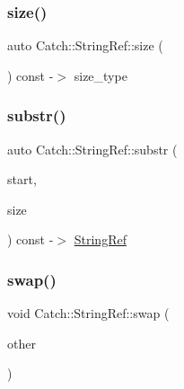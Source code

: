 \mbox{\label{classCatch_1_1StringRef_ae084d72cb2952cee61a63ef36611d0ad}} 
\subsubsection{\texorpdfstring{size()}{size()}}
{\footnotesize\ttfamily auto Catch\+::\+String\+Ref\+::size (\begin{DoxyParamCaption}{ }\end{DoxyParamCaption}) const -\/$>$  size\+\_\+type\hspace{0.3cm}{\ttfamily [noexcept]}}

\mbox{\label{classCatch_1_1StringRef_a248568b467cf6599320903ae613c8eee}} 
\subsubsection{\texorpdfstring{substr()}{substr()}}
{\footnotesize\ttfamily auto Catch\+::\+String\+Ref\+::substr (\begin{DoxyParamCaption}\item[{size\+\_\+type}]{start,  }\item[{size\+\_\+type}]{size }\end{DoxyParamCaption}) const -\/$>$  \mbox{\hyperlink{classCatch_1_1StringRef}{String\+Ref}}\hspace{0.3cm}{\ttfamily [noexcept]}}

\mbox{\label{classCatch_1_1StringRef_a8a843e39ad3560d10a80524ed926ed63}} 
\subsubsection{\texorpdfstring{swap()}{swap()}}
{\footnotesize\ttfamily void Catch\+::\+String\+Ref\+::swap (\begin{DoxyParamCaption}\item[{\mbox{\hyperlink{classCatch_1_1StringRef}{String\+Ref}} \&}]{other }\end{DoxyParamCaption})\hspace{0.3cm}{\ttfamily [noexcept]}}



